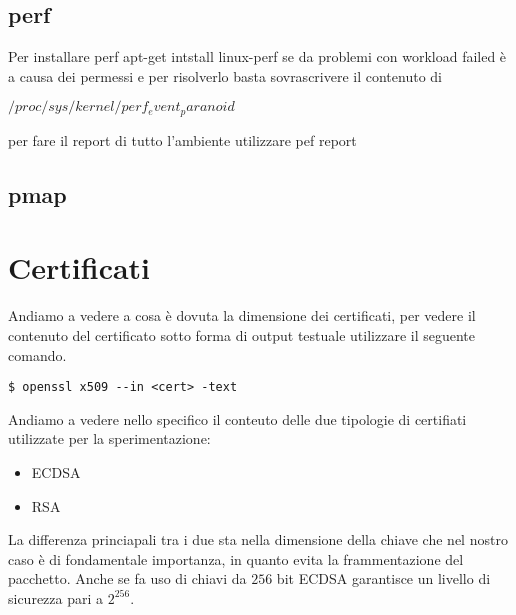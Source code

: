 \documentclass[
10pt, %
a4paper, %
oneside, %
headinclude,footinclude, %
BCOR5mm, %
]{scrartcl}
\begin{document}
\subsection{perf}

Per installare perf apt-get intstall linux-perf se da problemi con workload failed è a causa dei permessi e per risolverlo basta sovrascrivere il contenuto di

$/proc/sys/kernel/perf_event_paranoid$

per fare il report di tutto l'ambiente utilizzare pef report

\subsection{pmap}

\newpage

\section{Certificati}
\hypertarget{certificati}{}
Andiamo a vedere a cosa è dovuta la dimensione dei certificati, per vedere il contenuto del certificato sotto forma di output testuale utilizzare il seguente comando.
\begin{lstlisting}
$ openssl x509 --in <cert> -text
\end{lstlisting}

\vspace*{0.2cm}
\noindent
Andiamo a vedere nello specifico il conteuto delle due tipologie di certifiati utilizzate per la sperimentazione:
\begin{itemize}
    \item ECDSA
    \item RSA
\end{itemize}
\vspace*{0.2cm}
\noindent
La differenza princiapali tra i due sta nella dimensione della chiave che nel nostro caso è di fondamentale importanza, in quanto evita la frammentazione del pacchetto.
Anche se fa uso di chiavi da $256$ bit ECDSA garantisce un livello di sicurezza pari a $2^{256}$.
\end{document}
